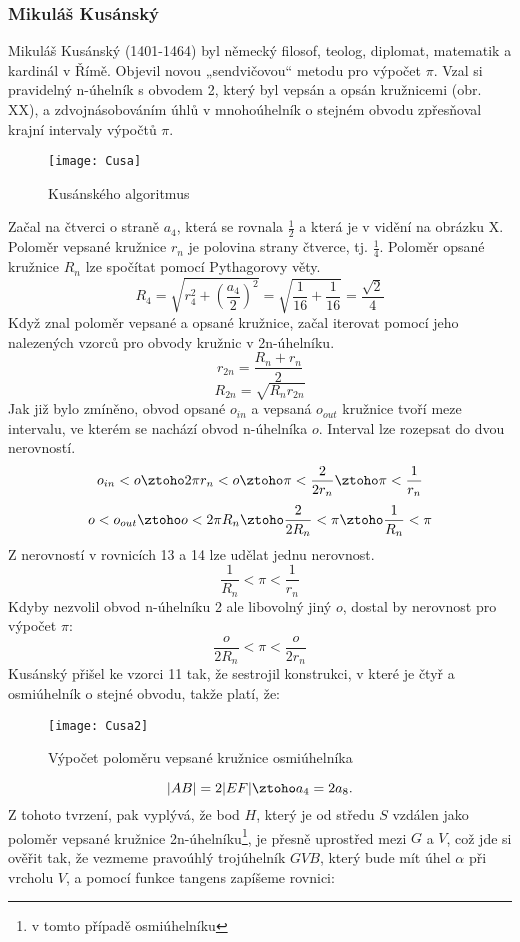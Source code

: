 \documentclass[rocnikovka]{gzwroc} %
\begin{document}
\subsubsection{Mikuláš Kusánský}
Mikuláš Kusánský (1401-1464) byl německý filosof, teolog, diplomat, matematik a kardinál v Římě. Objevil novou „sendvičovou“ metodu pro výpočet $\pi$. Vzal si pravidelný n-úhelník s obvodem 2, který byl vepsán a opsán kružnicemi (obr. XX), a zdvojnásobováním úhlů v mnohoúhelník o stejném obvodu zpřesňoval krajní intervaly výpočtů $\pi$.\\
\begin{figure}[!ht]
\texttt{[image: Cusa]}
\caption{Kusánského algoritmus}
\label{fig:kruh}
\end{figure}
Začal na čtverci o straně $a_4$, která se rovnala $\frac{1}{2}$ a která je v vidění na obrázku X. Poloměr vepsané kružnice $r_n$ je polovina strany čtverce, tj. $\frac{1}{4}$. Poloměr opsané kružnice $R_n$ lze spočítat pomocí Pythagorovy věty.
$$
R_4=\sqrt{r_4^2+\left(\frac{a_4}{2}\right)^2}=\sqrt{\frac{1}{16}+\frac{1}{16}}=\frac{\sqrt{2}}{4}
$$
Když znal poloměr vepsané a opsané kružnice, začal iterovat pomocí jeho nalezených vzorců pro obvody kružnic v 2n-úhelníku.
\begin{equation}
r_{2n}=\frac{R_n+r_n}{2} 
\end{equation}
\begin{equation}
R_{2n}=\sqrt{R_nr_{2n}}
\end{equation} 
Jak již bylo zmíněno, obvod opsané $o_{in}$ a vepsaná $o_{out}$ kružnice tvoří meze intervalu, ve kterém se nachází obvod n-úhelníka $o$. Interval lze rozepsat do dvou nerovností.
$$
o_{in}<o \ztoho 2\pi r_n<o \ztoho \pi<\frac{2}{2r_n} \ztoho \pi<\frac{1}{r_n}
$$
$$
o<o_{out} \ztoho o<2\pi R_n \ztoho \frac{2}{2R_n}<\pi \ztoho \frac{1}{R_n}<\pi
$$
Z nerovností v rovnicích 13 a 14 lze udělat jednu nerovnost.
\begin{equation}
\frac{1}{R_n}<\pi<\frac{1}{r_n}
\end{equation}
Kdyby nezvolil obvod n-úhelníku 2 ale libovolný jiný $o$, dostal by nerovnost pro výpočet $\pi$:
$$
\frac{o}{2R_n}<\pi<\frac{o}{2r_n}
$$
Kusánský přišel ke vzorci 11 tak, že sestrojil konstrukci, v které je čtyř a osmiúhelník o stejné obvodu, takže platí, že:
\begin{figure}[!ht]
\texttt{[image: Cusa2]}
\caption{Výpočet poloměru vepsané kružnice osmiúhelníka}
\label{fig:kruh}
\end{figure}
$$
|AB|=2|EF| \ztoho a_4=2a_8.
$$
Z tohoto tvrzení, pak vyplývá, že bod $H$, který je od středu $S$ vzdálen jako poloměr vepsané kružnice 2n-úhelníku\footnote[7]{v tomto případě osmiúhelníku}, je přesně uprostřed mezi $G$ a $V$, což jde si ověřit tak, že vezmeme pravoúhlý trojúhelník $GVB$, který bude mít úhel $\alpha$ při vrcholu $V$, a pomocí funkce tangens zapíšeme rovnici: %
\end{document}
